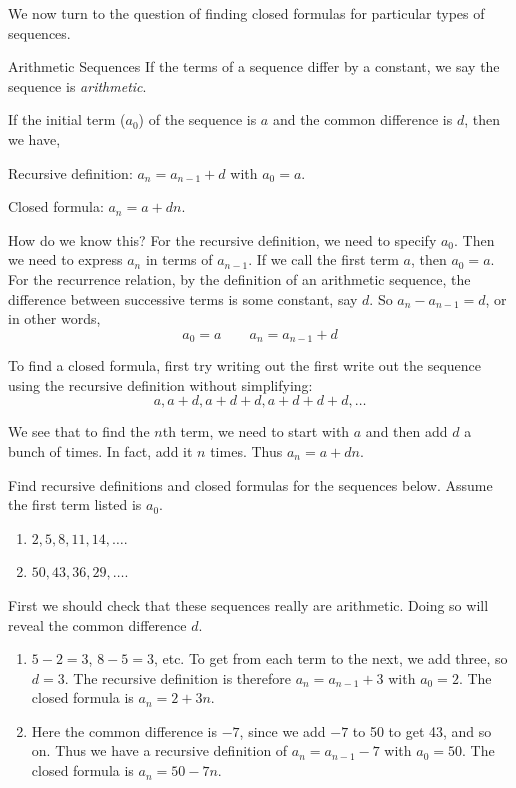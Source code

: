 \documentclass[12pt]{article}
\begin{document}
We now turn to the question of finding closed formulas for particular types of sequences.

\begin{defbox}{Arithmetic Sequences}
  If the terms of a sequence differ by a constant, we say the sequence is {\em arithmetic}.
  
  If the initial term ($a_0$) of the sequence is $a$ and the common difference is $d$, then we have,
  
  Recursive definition: $a_n = a_{n-1} + d$ with $a_0 = a$.
  
  Closed formula: $a_n = a + dn$.
\end{defbox}

How do we know this? For the recursive definition, we need to specify $a_0$.  Then we need to express $a_n$ in terms of $a_{n-1}$.  If we call the first term $a$, then $a_0 = a$.  For the recurrence relation, by the definition of an arithmetic sequence, the difference between successive terms is some constant, say $d$.  So $a_n - a_{n-1} = d$, or in other words, \[ a_0 = a \qquad a_n=a_{n-1}+d\]

To find a closed formula, first try writing out the first write out the sequence using the recursive definition without simplifying:
\[a, a+d, a+d+d, a+d+d+d, \ldots\]

We see that to find the $n$th term, we need to start with $a$ and then add $d$ a bunch of times. In fact, add it $n$ times.  Thus $a_n = a+dn$.  

\begin{example}
  Find recursive definitions and closed formulas for the sequences below.  Assume the first term listed is $a_0$.
  \begin{enumerate}
  \item $2, 5, 8, 11, 14, \ldots$.
    \item $50, 43, 36, 29, \ldots$.
    
  \end{enumerate}
  \begin{solution}
  First we should check that these sequences really are arithmetic.  Doing so will reveal the common difference $d$.
    \begin{enumerate}
      \item $5-2 = 3$, $8-5 = 3$, etc.  To get from each term to the next, we add three, so $d = 3$.  The recursive definition is therefore $a_n = a_{n-1} + 3$ with $a_0 = 2$.  The closed formula is $a_n = 2 + 3n$.
      \item Here the common difference is $-7$, since we add $-7$ to 50 to get 43, and so on.  Thus we have a recursive definition of $a_n = a_{n-1} - 7$ with $a_0 = 50$.  The closed formula is $a_n = 50 - 7n$.
    \end{enumerate}

  \end{solution}

\end{example}
\end{document}
